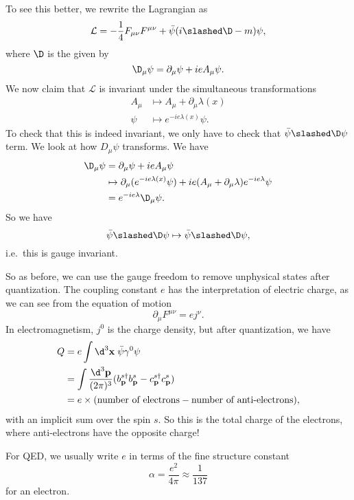 \documentclass[a4paper]{article}
\begin{document}
To see this better, we rewrite the Lagrangian as
\[
  \mathcal{L} = -\frac{1}{4} F_{\mu\nu} F^{\mu\nu} + \bar\psi(i \slashed \D - m)\psi,
\]
where $\D$ is the  given by
\[
  \D_\mu \psi = \partial_\mu \psi + i e A_\mu \psi.
\]
We now claim that $\mathcal{L}$ is invariant under the simultaneous transformations
\begin{align*}
  A_\mu &\mapsto A_\mu + \partial_\mu \lambda(x)\\
  \psi &\mapsto e^{-ie \lambda(x)} \psi.
\end{align*}
To check that this is indeed invariant, we only have to check that $\bar\psi\slashed \D \psi$ term. We look at how $D_\mu \psi$ transforms. We have
\begin{align*}
  \D_\mu \psi &= \partial_\mu \psi + ie A_\mu \psi\\
  &\mapsto \partial_\mu (e^{-ie\lambda(x)} \psi) + ie (A_\mu + \partial_\mu \lambda) e^{-ie\lambda}\psi\\
  &= e^{-ie\lambda} \D_\mu\psi.
\end{align*}
So we have
\[
  \bar\psi \slashed \D \psi \mapsto \bar\psi \slashed \D \psi,
\]
i.e.\ this is gauge invariant.

So as before, we can use the gauge freedom to remove unphysical states after quantization. The coupling constant $e$ has the interpretation of electric charge, as we can see from the equation of motion
\[
  \partial_\mu F^{\mu\nu} = ej^\nu.
\]
In electromagnetism, $j^0$ is the charge density, but after quantization, we have
\begin{align*}
  Q &= e \int \d^3 \mathbf{x}\; \bar\psi \gamma^0 \psi \\
  &= \int \frac{\d^3 \mathbf{p}}{(2\pi)^3} (b_\mathbf{p}^{s\dagger} b_\mathbf{p}^s - c_\mathbf{p}^{s\dagger} c_\mathbf{p}^s)\\
  &= e \times (\text{number of electrons} - \text{number of anti-electrons}),
\end{align*}
with an implicit sum over the spin $s$. So this is the total charge of the electrons, where anti-electrons have the opposite charge!

For QED, we usually write $e$ in terms of the fine structure constant
\[
  \alpha = \frac{e^2}{4\pi} \approx \frac{1}{137}
\]
for an electron.
\end{document}
